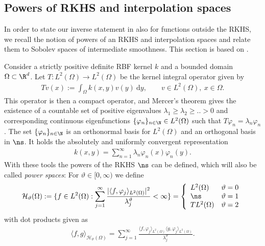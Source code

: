 \documentclass[a4paper, 10pt]{article}
\newcommand{\Ht}{\mathcal{H}_{\vartheta}}
\begin{document}
%
%
%
%
%
%
%


\subsection{Powers of RKHS and interpolation spaces} \label{subsec:power_spaces}

In order to state our inverse statement in  also for functions outside the RKHS, 
we recall the notion of powers of an RKHS and interpolation spaces and relate them to Sobolev spaces of intermediate smoothness.
This section is based on \cite{steinwart2012mercer, lions2012non, wendland2005scattered}.

Consider a strictly positive definite RBF kernel $k$ and a bounded domain $\Omega \subset \R^d$.
Let $T: L^2(\Omega) \rightarrow L^2(\Omega)$ be the kernel integral operator given by
\begin{align*}
Tv(x) := \int_{\Omega} k(x, y) v(y) ~ \mathrm{d}y, \qquad v \in L^2(\Omega), ~ x \in \Omega.
\end{align*}
This operator is then a compact operator, 
and Mercer's theorem gives the existence of a countable set of positive eigenvalues $\lambda_1 \geq \lambda_2 \geq .. > 0$ and corresponding continuous eigenfunctions $\{ \varphi_n \}_{n \in \N} \in L^2(\Omega)$ such that $T \varphi_n = \lambda_n \varphi_n$.
The set $\{ \varphi_n \}_{n \in \N}$ is an orthonormal basis for $L^2(\Omega)$ and an orthogonal basis in $\ns$. 
It holds the absolutely and uniformly convergent representation
\begin{align*}
k(x,y) = \sum_{n=1}^\infty \lambda_n \varphi_n(x) \varphi_n(y).
\end{align*}
With these tools the powers of the RKHS $\ns$ can be defined, which will also be called \textit{power spaces}: 
For $\vartheta \in [0, \infty)$ we define 
\begin{align}
\label{eq:power_spaces}
\Ht(\Omega) := \{ f \in L^2(\Omega): \sum_{j=1}^\infty \frac{|\langle f, \varphi_j \rangle_{L^2(\Omega)}|^2}{\lambda_j^\vartheta}  < \infty \} =\left\{
\begin{array}{ll}
L^2(\Omega) & \vartheta = 0 \\
\ns & \vartheta = 1 \\
TL^2(\Omega) & \vartheta = 2 \\
\end{array}
\right.
\end{align}
with dot products given as
\begin{align*}
\langle f, g \rangle_{\Ht(\Omega)} = \sum_{j = 1}^\infty \frac{\langle f, \varphi_j \rangle_{L^2(\Omega)} \langle g, \varphi_j \rangle_{L^2(\Omega)}}{\lambda_j^\vartheta}.
\end{align*}
\end{document}
